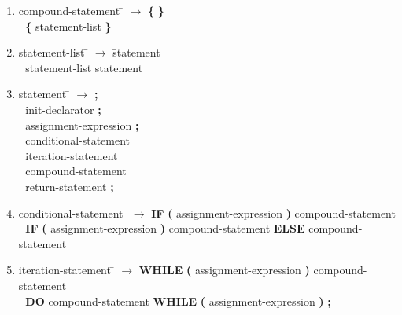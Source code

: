 \documentclass[12pt]{article}
\begin{document}
\begin{enumerate}
\item \begin{tabbing} compound-statement \= $\rightarrow$ \= \textbf{\{} \textbf{\}} \\
	\> \hspace*{0.05cm} | \> \textbf{\{} statement-list \textbf{\}} \\
\end{tabbing}

\item \begin{tabbing} statement-list \= $\rightarrow$ \= statement \\
	\> \hspace*{0.05cm} | \> statement-list statement
\end{tabbing}

\item \begin{tabbing} statement \= $\rightarrow$ \= \textbf{;} \\
	\> \hspace*{0.05cm} | \> init-declarator \textbf{;} \\
	\> \hspace*{0.05cm} | \> assignment-expression \textbf{;} \\
	\> \hspace*{0.05cm} | \> conditional-statement \\
	\> \hspace*{0.05cm} | \> iteration-statement \\
	\> \hspace*{0.05cm} | \> compound-statement \\
	\> \hspace*{0.05cm} | \> return-statement \textbf{;} \\
\end{tabbing}

\item \begin{tabbing} conditional-statement \= $\rightarrow$ \= \textbf{IF} \textbf{(} assignment-expression \textbf{)} compound-statement \\
	\> \hspace*{0.05cm} | \> \textbf{IF} \textbf{(} assignment-expression \textbf{)} compound-statement \textbf{ELSE} compound-statement \\
\end{tabbing}

\item \begin{tabbing} iteration-statement \= $\rightarrow$ \= \textbf{WHILE} \textbf{(} assignment-expression \textbf{)} compound-statement \\
	\> \hspace*{0.05cm} | \> \textbf{DO} compound-statement \textbf{WHILE} \textbf{(} assignment-expression \textbf{)} \textbf{;} \\
\end{tabbing}


\end{enumerate}
\end{document}
